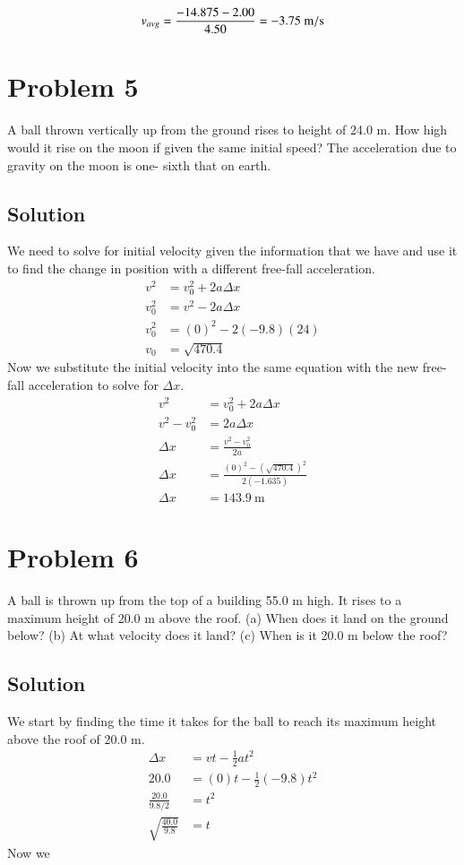 \documentclass{article}
\begin{document}
\[
	v_{avg} = \frac{-14.875-2.00}{4.50} = -3.75\ \unit{{\meter\per\second}}
\]

\section*{Problem 5}
A ball thrown vertically up from the ground rises to height of 24.0 m. How high would it rise
on the moon if given the same initial speed? The acceleration due to gravity on the moon is one-
sixth that on earth.

\subsection*{Solution}
We need to solve for initial velocity given the information that we have and use it to find the change in position with a different free-fall acceleration.
\begin{align*}
	v^2 &= v_0^2 + 2a \Delta x \\
	v_0^2 & = v^2 - 2a \Delta x \\
	v_0^2 &= (0)^2 -2(-9.8)(24) \\
	v_0 &= \sqrt{470.4}
\end{align*}
Now we substitute the initial velocity into the same equation with the new free-fall acceleration to solve for $\Delta x$.
\begin{align*}
	v^2 &= v_0^2 + 2a \Delta x \\
	v^2 - v_0^2 &= 2a \Delta x \\
	\Delta x &= \frac{v^2 - v_0^2}{2a} \\
	\Delta x &= \frac{(0)^2 - \left( \sqrt{470.4} \right)^2}{2(-1.635)} \\
	\Delta x &= 143.9\ \unit{\meter}
\end{align*}

\section*{Problem 6}
A ball is thrown up from the top of a building 55.0 m high. It rises to a maximum height
of 20.0 m above the roof. (a) When does it land on the ground below? (b) At what velocity
does it land? (c) When is it 20.0 m below the roof?

\subsection*{Solution}
We start by finding the time it takes for the ball to reach its maximum height above the roof of 20.0 m.
\begin{align*}
	\Delta x &= vt - \frac{1}{2} at^2 \\
	20.0 &= (0)t - \frac{1}{2}(-9.8)t^2 \\
	\frac{20.0}{9.8/2} &= t^2 \\
	\sqrt{\frac{40.0}{9.8}} &= t
\end{align*}
Now we
\end{document}

